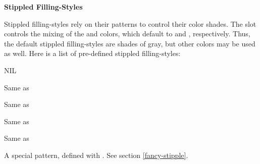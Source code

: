 \vspace{1 line}
\begin{group}
{\bf Stippled Filling-Styles}

Stippled filling-styles rely on their patterns to control their color shades.
The  slot controls the mixing of the  and
 colors, which default to  and
, respectively.  Thus, the default stippled filling-styles
are shades of gray, but other colors may be used as well.
Here is a list of pre-defined stippled filling-styles:

\begin{description}
\item[]   
 
 

\item[]  \dash NIL

\item[]  \dash Same as 

\item[]  \dash Same as 

\item[]  \dash Same as 

\item[]  \dash Same as 

\item[]  \dash A special pattern, defined with
.  See section \ref{fancy-stipple}.
\end{description}
\end{group}

